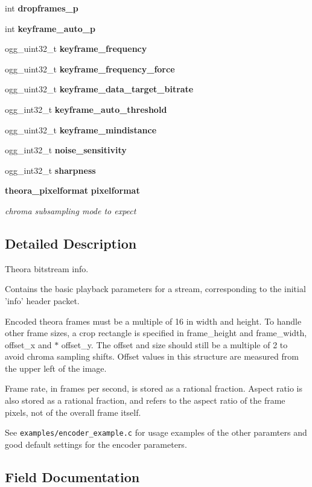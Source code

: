 \begin{DoxyCompactItemize}
int {\bf dropframes\-\_\-p}
\item 
int {\bf keyframe\-\_\-auto\-\_\-p}
\item 
ogg\-\_\-uint32\-\_\-t {\bf keyframe\-\_\-frequency}
\item 
ogg\-\_\-uint32\-\_\-t {\bf keyframe\-\_\-frequency\-\_\-force}
\item 
ogg\-\_\-uint32\-\_\-t {\bf keyframe\-\_\-data\-\_\-target\-\_\-bitrate}
\item 
ogg\-\_\-int32\-\_\-t {\bf keyframe\-\_\-auto\-\_\-threshold}
\item 
ogg\-\_\-uint32\-\_\-t {\bf keyframe\-\_\-mindistance}
\item 
ogg\-\_\-int32\-\_\-t {\bf noise\-\_\-sensitivity}
\item 
ogg\-\_\-int32\-\_\-t {\bf sharpness}
\item 
{\bf theora\-\_\-pixelformat} {\bf pixelformat}
\begin{DoxyCompactList}\small\item\em chroma subsampling mode to expect \end{DoxyCompactList}\end{DoxyCompactItemize}


\subsection{\-Detailed \-Description}
\-Theora bitstream info. 

\-Contains the basic playback parameters for a stream, corresponding to the initial 'info' header packet.

\-Encoded theora frames must be a multiple of 16 in width and height. \-To handle other frame sizes, a crop rectangle is specified in frame\-\_\-height and frame\-\_\-width, offset\-\_\-x and $\ast$ offset\-\_\-y. \-The offset and size should still be a multiple of 2 to avoid chroma sampling shifts. \-Offset values in this structure are measured from the upper left of the image.

\-Frame rate, in frames per second, is stored as a rational fraction. \-Aspect ratio is also stored as a rational fraction, and refers to the aspect ratio of the frame pixels, not of the overall frame itself.

\-See {\tt examples/encoder\-\_\-example.\-c} for usage examples of the other paramters and good default settings for the encoder parameters. 

\subsection{\-Field \-Documentation}

